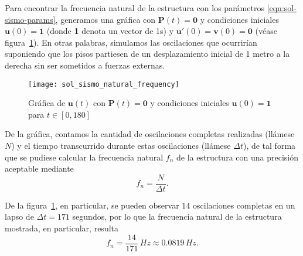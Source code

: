 \begin{appendices}
Para encontrar la frecuencia natural de la estructura con los parámetros \eqref{eqn:sol-sismo-params}, generamos una gráfica con \(\mathbf{P}(t) = \mathbf{0}\) y condiciones iniciales \(\mathbf{u}(0) = \mathbf{1}\) (donde \textbf{1} denota un vector de 1s) y \(\mathbf{u}'(0) = \mathbf{v}(0) = \mathbf{0}\) (véase figura~\ref{fig:sol-natural-frequency}). En otras palabras, simulamos las oscilaciones que ocurrirían suponiendo que los pisos partiesen de un desplazamiento inicial de 1 metro a la derecha sin ser sometidos a fuerzas externas.

\begin{figure}[ht!]
    \centering
    \texttt{[image: sol\_sismo\_natural\_frequency]}
    \caption{Gráfica de \(\mathbf{u}(t)\) con \(\mathbf{P}(t) = \mathbf{0}\) y condiciones iniciales \(\mathbf{u}(0) = \mathbf{1}\) para \(t \in [0, 180]\)}
    \label{fig:sol-natural-frequency}
\end{figure}

De la gráfica, contamos la cantidad de oscilaciones completas realizadas (llámese \(N\)) y el tiempo transcurrido durante estas oscilaciones (llámese \(\Delta t\)), de tal forma que se pudiese calcular la frecuencia natural \(f_n\) de la estructura con una precisión aceptable mediante
\[
    f_n = \frac{N}{\Delta t}
.\]

De la figura~\ref{fig:sol-natural-frequency}, en particular, se pueden observar \(14\) oscilaciones completas en un lapso de \(\Delta t = 171\) segundos, por lo que la frecuencia natural de la estructura mostrada, en particular, resulta
\[
    f_n = \frac{14}{171} \, \si{Hz} \approx 0.0819 \, \si{Hz}
.\]

\end{appendices}
